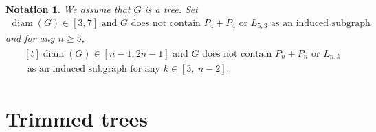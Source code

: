 \documentclass{amsart}
\newtheorem{notation}[theorem]{Notation}
\theoremstyle{remark}
\theoremstyle{definition}
\DeclareMathOperator{\diam}{diam}
\begin{document}
    \begin{notation}\normalfont\label{F(n) condition} %
	    We assume that $G$ is a tree. Set
	\begin{align*}
		\diam(G)\in [3,7] \text{ and } G \text{ does not contain $P_4+P_4$ or $L_{5,3}$ as an induced subgraph} \tag{$F_4$}
	\end{align*}
	and for any $n\geq 5$,
	\begin{align*}
		&\begin{multlined}[t]
			\diam(G)\in [n-1,2n-1] \text{ and } G \text{ does not contain $P_n+P_n$ or $L_{n,k}$}\\
			\text{ as an induced subgraph for any $k\in [3,\ n-2].$}
		\end{multlined} \tag{$F_n$}
	\end{align*}
	\end{notation}
    
    
	
	\section{Trimmed trees}\label{sec:trimmed trees}
	
	
\end{document}
